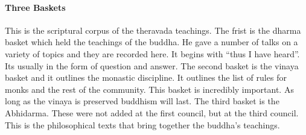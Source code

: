 \documentclass{article}
\begin{document}
\paragraph{Three Baskets}
\label{par:three_baskets}
This is the scriptural corpus of the theravada teachings. The frist is the dharma basket which held the teachings of the buddha. He gave a number of talks on a variety of topics and they are recorded here. It begins with ``thus I have heard''. Its usually in the form of question and answer. The second basket is the vinaya basket and it outlines the monastic discipline. It outlines the list of rules for monks and the rest of the community. This basket is incredibly important. As long as the vinaya is preserved buddhism will last. The third basket is the Abhidarma. These were not added at the first council, but at the third council. This is the philosophical texts that bring together the buddha's teachings.
\end{document}
